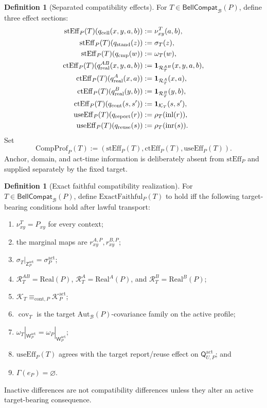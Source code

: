 \documentclass[11pt]{article}
\theoremstyle{definition}
\newtheorem{definition}[theorem]{Definition}
\newcommand{\Bell}{\mathcal{B}}
\newcommand{\Real}{\mathrm{Real}}
\newcommand{\AutBell}{\mathrm{Aut}_{\Bell}(P)}
\newcommand{\GlobalSec}{\Gamma}
\newcommand{\BellCompat}{\mathsf{BellCompat}_{\Bell}(P)}
\newcommand{\ExactFaithful}{\mathrm{ExactFaithful}_{P}}
\newcommand{\StandEff}{\mathrm{stEff}_{P}}
\newcommand{\ContEff}{\mathrm{ctEff}_{P}}
\newcommand{\ReuseEff}{\mathrm{useEff}_{P}}
\newcommand{\CompProf}{\mathrm{CompProf}_{P}}
\newcommand{\Active}{\mathrm{act}}
\newcommand{\ContEq}{\equiv_{\mathrm{cont},P}}
\begin{document}
\begin{definition}[Separated compatibility effects]\label{def:standingeffectmap}
For $T\in\BellCompat$, define three effect sections:
\begin{align*}
\StandEff(T)(q_{\rm cell}(x,y,a,b))&:=\nu^T_{xy}(a,b),\\
\StandEff(T)(q_{\rm stand}(z))&:=\sigma_T(z),\\
\StandEff(T)(q_{\rm cmp}(w))&:=\omega_T(w),\\
\ContEff(T)(q^{AB}_{\rm real}(x,y,a,b))&:=\mathbf 1_{\mathcal R_T^{AB}}(x,y,a,b),\\
\ContEff(T)(q^{A}_{\rm real}(x,a))&:=\mathbf 1_{\mathcal R_T^{A}}(x,a),\\
\ContEff(T)(q^{B}_{\rm real}(y,b))&:=\mathbf 1_{\mathcal R_T^{B}}(y,b),\\
\ContEff(T)(q_{\rm cont}(s,s'))&:=\mathbf 1_{\mathcal K_T}(s,s'),\\
\ReuseEff(T)(q_{\rm report}(r))&:=\rho_T(\mathrm{inl}(r)),\\
\ReuseEff(T)(q_{\rm reuse}(s))&:=\rho_T(\mathrm{inr}(s)).
\end{align*}
Set
\[
\CompProf(T):=(\StandEff(T),\ContEff(T),\ReuseEff(T)).
\]
Anchor, domain, and act-time information is deliberately absent from $\StandEff$ and supplied separately by the fixed target.
\end{definition}

\begin{definition}[Exact faithful compatibility realization]\label{def:exactfaithfulcompatibility}
For $T\in\BellCompat$, define $\ExactFaithful(T)$ to hold iff the following target-bearing conditions hold after lawful transport:
\begin{enumerate}[label=(E\arabic*),leftmargin=3em]
\item $\nu^T_{xy}=P_{xy}$ for every context;
\item the marginal maps are $r^{A,P}_{xy},r^{B,P}_{xy}$;
\item $\sigma_T|_{\mathsf Z_P^{\Active}}=\sigma_P^{\Active}$;
\item $\mathcal R_T^{AB}=\Real(P)$, $\mathcal R_T^A=\Real^A(P)$, and $\mathcal R_T^B=\Real^B(P)$;
\item $\mathcal K_T\ContEq\mathcal K_P^{\Active}$;
\item $\operatorname{cov}_T$ is the target $\AutBell$-covariance family on the active profile;
\item $\omega_T|_{\mathsf W_P^{\Active}}=\omega_P|_{\mathsf W_P^{\Active}}$;
\item $\ReuseEff(T)$ agrees with the target report/reuse effect on $\mathsf Q_{U,P}^{\Active}$; and
\item $\GlobalSec(e_P)=\varnothing$.
\end{enumerate}
Inactive differences are not compatibility differences unless they alter an active target-bearing consequence.
\end{definition}
\end{document}
